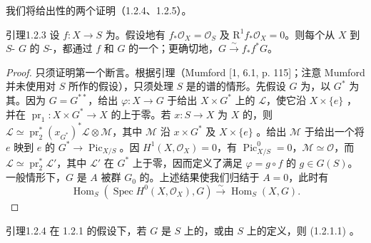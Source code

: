 我们将给出性的两个证明（1.2.4、1.2.5）。
\begin{SGAresult}{引理}{1.2.3}
设 $f:X\to S$ 为。假设地有 $f_*\mathscr O_X=\mathscr O_S$ 及 $\mathrm R^1f_*\mathscr O_X=0$。则每个从 $X$ 到 $S$- $G$ 的 $S$-，都通过 $f$ 和 $G$ 的一个；更确切地，$G\xrightarrow\sim f_*f^*G$。
\end{SGAresult}
\begin{proof}
只须证明第一个断言。根据引理（Mumford [1, 6.1, p. 115]；注意 Mumford 并未使用对 $S$ 所作的假设），只须处理 $S$ 是的谱的情形。先假设 $G$ 为，以 $G^*$ 为其。因为 $G=G^{**}$，给出 $\varphi:X\to G$ 于给出 $X\times G^*$ 上的 $\mathscr L$，使它沿 $X\times\{e\}$ ，并在 $\operatorname{pr}_1:X\times G^*\to X$ 的上于零。若 $x:S\to X$ 为 $X$ 的，则 $\mathscr L\simeq\operatorname{pr}_2^*(x_{G^*})^*\mathscr L\otimes\mathscr M$，其中 $\mathscr M$ 沿 $x\times G^*$ 及 $X\times\{e\}$ 。给出 $\mathscr M$ 于给出一个将 $e$ 映到 $e$ 的 $G^*\to\operatorname{Pic}_{X/S}$。因 $H^1(X,\mathscr O_X)=0$，有 $\operatorname{Pic}^0_{X/S}=0$，$\mathscr M\simeq\mathscr O$，而 $\mathscr L\simeq\operatorname{pr}_2^*\mathscr L'$，其中 $\mathscr L'$ 在 $G^*$ 上于零，因而定义了满足 $\varphi=g\circ f$ 的 $g\in G(S)$。
一般情形下，$G$ 是 $A$ 被群 $G_0$ 的。上述结果使我们归结于 $A=0$，此时有
\[\operatorname{Hom}_S(\operatorname{Spec}H^0(X,\mathscr O_X),G)\xrightarrow\sim\operatorname{Hom}_S(X,G).\]
\end{proof}
\begin{SGAresult}{引理}{1.2.4}
在 1.2.1 的假设下，若 $G$ 是 $S$ 上的，或由 $S$ 上的定义，则 (1.2.1.1) 。
\end{SGAresult}
